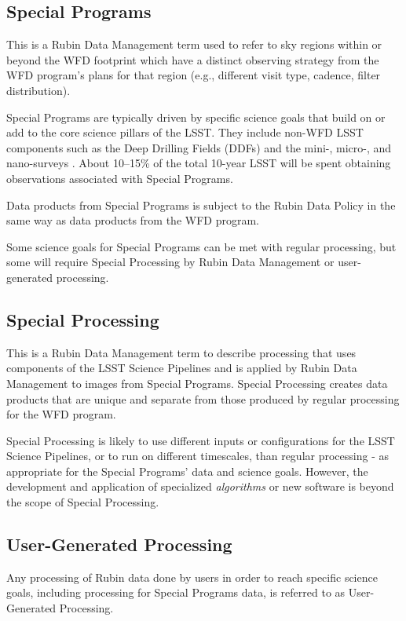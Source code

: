 \subsection{Special Programs} 

This is a Rubin Data Management term used to refer to sky regions within
or beyond the WFD footprint which have a distinct observing strategy from
the WFD program's plans for that region (e.g., different visit type, cadence, filter distribution).

Special Programs are typically driven by specific science goals that build on or 
add to the core science pillars of the LSST.
They include non-WFD LSST components such as the Deep Drilling 
Fields (DDFs) and the mini-, micro-, and nano-surveys .
About 10--15\% of the total 10-year LSST will be spent obtaining 
observations associated with Special Programs.

Data products from Special Programs is subject to the Rubin Data Policy 
in the same way as data products from the WFD program.

Some science goals for Special Programs can be met with regular processing,
but some will require Special Processing by Rubin Data Management or user-generated processing.

\subsection{Special Processing}

This is a Rubin Data Management term to describe processing that 
uses components of the LSST Science Pipelines and is applied by Rubin
Data Management to images from Special Programs.
Special Processing creates data products that are unique and separate from those produced
by regular processing for the WFD program.

Special Processing is likely to use different inputs or configurations for the
LSST Science Pipelines, or to run on different timescales, than regular processing - 
as appropriate for the Special Programs' data and science goals.
However, the development and application of specialized \emph{algorithms} or new software
is beyond the scope of Special Processing.

\subsection{User-Generated Processing}

Any processing of Rubin data done by users in order to reach specific science goals, including
processing for Special Programs data, is referred to as User-Generated Processing.

